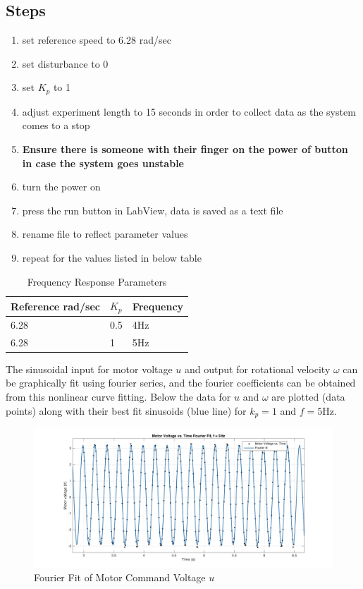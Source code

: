 \documentclass[11pt,titlepage]{article}
\begin{document}
	\subsection*{Steps}
		\begin{enumerate}
			\item set reference speed to 6.28 rad/sec
			\item set disturbance to 0
			\item set $K_p$ to 1
			\item adjust experiment length to 15 seconds in order to collect data as the system comes to a stop
			\item \textbf{Ensure there is someone with their finger on the power of button in case the system goes unstable}
			\item turn the power on
			\item press the run button in LabView, data is saved as a text file
			\item rename file to reflect parameter values
			\item repeat for the values listed in below table
		\end{enumerate}
		\begin{table}[h!]
			\centering
			\begin{tabular}{|m{4cm}|m{3cm}|m{3cm}|} 
				\hline
				Reference rad/sec & $K_p$ & Frequency \\ 
				\hline
				6.28 & 0.5 & 4Hz \\
				\hline
				6.28 & 1 & 5Hz\\
				\hline
			\end{tabular}
			\caption{Frequency Response Parameters} \label{table:freq_param}
		\end{table}
		The sinusoidal input for motor voltage $u$ and output for rotational velocity $\omega$ can be graphically fit using fourier series, and the fourier coefficients can be obtained from this nonlinear curve fitting. Below the data for $u$ and $\omega$ are plotted (data points) along with their best fit sinusoids (blue line) for $k_p=1$ and $f=5$Hz.
		
	\begin{figure}[h!]
		\centering
		\includegraphics[trim={6cm 0 0 0},clip,angle=0,origin=c,scale=0.3]{fourier_volt_5Hz}
		\caption{Fourier Fit of Motor Command Voltage $u$}
		\label{fig:fourier_volt_5Hz}
	\end{figure}
	
\end{document}
